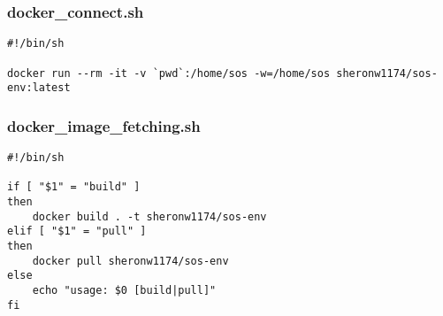 \documentclass[main.tex]{subfiles}
\begin{document}
\subsubsection{docker\_connect.sh}
\begin{lstlisting}
#!/bin/sh

docker run --rm -it -v `pwd`:/home/sos -w=/home/sos sheronw1174/sos-env:latest
\end{lstlisting}

\subsubsection{docker\_image\_fetching.sh}
\begin{lstlisting}
#!/bin/sh

if [ "$1" = "build" ]
then
    docker build . -t sheronw1174/sos-env
elif [ "$1" = "pull" ]
then
    docker pull sheronw1174/sos-env
else
    echo "usage: $0 [build|pull]"
fi
\end{lstlisting}
\end{document}
